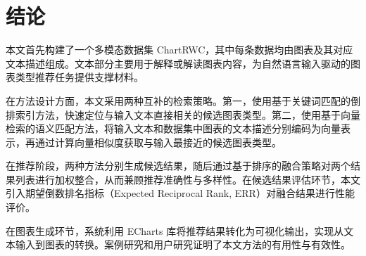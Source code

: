\section{结论}

本文首先构建了一个多模态数据集 ChartRWC，其中每条数据均由图表及其对应文本描述组成。文本部分主要用于解释或解读图表内容，为自然语言输入驱动的图表类型推荐任务提供支撑材料。

在方法设计方面，本文采用两种互补的检索策略。第一，使用基于关键词匹配的倒排索引方法，快速定位与输入文本直接相关的候选图表类型。第二，使用基于向量检索的语义匹配方法，将输入文本和数据集中图表的文本描述分别编码为向量表示，再通过计算向量相似度获取与输入最接近的候选图表类型。

在推荐阶段，两种方法分别生成候选结果，随后通过基于排序的融合策略对两个结果列表进行加权整合，从而兼顾推荐准确性与多样性。在候选结果评估环节，本文引入期望倒数排名指标（Expected Reciprocal Rank, ERR）对融合结果进行性能评价。

在图表生成环节，系统利用 ECharts 库将推荐结果转化为可视化输出，实现从文本输入到图表的转换。案例研究和用户研究证明了本文方法的有用性与有效性。

\newpage
